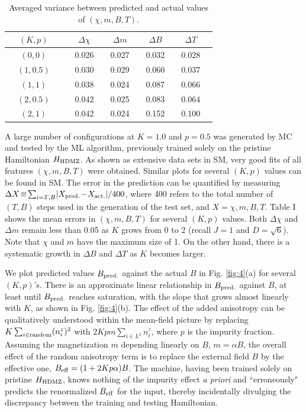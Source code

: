 \documentclass[reprint,amsmath,amssymb,aps,showpacs,superscriptaddress,prl]{revtex4-1}
\begin{document}
\begin{table}[htb]
\begin{tabular}{ | ccc || ccc  cc  cc  cc |}
\hline
 & $(K, p)$ & & & $\Delta\chi$ &  & $\Delta m$ &  & $\Delta B$ & & $\Delta T$ & \\ \hline
 & $(0,0)$  &  & & 0.026 & & 0.027 & & 0.032 & &  0.028 & \\ \hline
 & $(1,0.5)$ & & & 0.030 & & 0.029 & & 0.060 & & 0.037 & \\ \hline
 & $(1,1)$   & & & 0.038 & & 0.024 & & 0.087 & & 0.066 & \\ \hline
 & $(2, 0.5)$ & & & 0.042 & & 0.025 & & 0.083 & & 0.064 & \\ \hline
 & $(2,1)$ & & & 0.042 & & 0.024 & & 0.152 & & 0.100 & \\ \hline
\end{tabular}\label{tab:PBC}
\caption{Averaged variance between predicted and actual values of $(\chi, m, B, T)$.}
\end{table}

A large number of configurations at $K=1.0$ and $p=0.5$ was generated by MC and tested by the ML algorithm, previously  trained solely on the pristine Hamiltonian $H_{\rm HDMZ}$. As shown as extensive data sets in SM, very good fits of all features $(\chi, m, B, T)$ were obtained. Similar plots for several $(K,p)$ values can be found in SM. The error in the prediction can be quantified by measuring $\Delta X \! \equiv \!  \sum_{i=T,B} \! | X_{\rm pred.} \! - \! X_{\rm act.} | / 400 $, where 400 refers to the total number of $(T,B)$ steps used in the generation of the test set, and $X=\chi, m, B, T$. Table I shows the mean errors in $(\chi, m, B, T)$ for several $(K,p)$ values. Both $\Delta \chi$ and $\Delta m$ remain less than 0.05 as $K$ grows from 0 to 2 (recall $J=1$ and $D=\sqrt{6}$). Note that $\chi$ and $m$ have the maximum size of 1. On the other hand, there is a systematic growth in $\Delta B$ and $\Delta T$ as $K$ becomes larger.

We plot predicted values $B_{\rm pred.}$ against the actual $B$ in Fig. \ref{fig:4}(a) for several $(K,p)$'s. There is an approximate linear relationship in $B_{\rm pred.}$ against $B$, at least until $B_{\rm pred.}$ reaches saturation, with the slope that grows almost linearly with $K$, as shown in Fig. \ref{fig:4}(b). The effect of the added anisotropy can be qualitatively understood within the mean-field picture by replacing $K  \sum_{i \in {\rm random}}  (n^z_i )^2$ with $2K p m \sum_{i \in L^2} n^z_i$, where $p$ is the impurity fraction. Assuming the magnetization $m$ depending linearly on $B$, $m = \alpha B$, the overall effect of the random anisotropy term is to replace the external field $B$ by the effective one, $B_{\rm eff} = (1+ 2K p\alpha ) B$. The machine, having been trained solely on pristine $H_{\rm HDMZ}$, knows nothing of the impurity effect {\it a priori} and ``erroneously" predicts the renormalized $B_{\rm eff}$ for the input, thereby incidentally divulging the discrepancy between the training and testing Hamiltonian.
\end{document}
